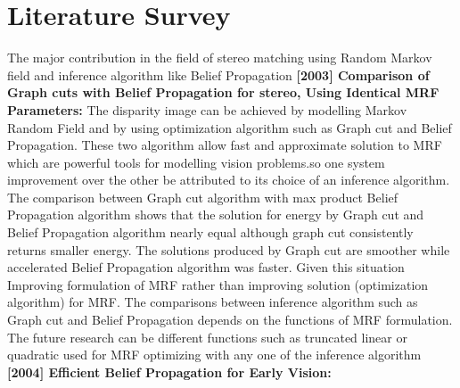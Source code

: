 \chapter{Literature Survey}
%
The major contribution in the field of stereo matching using Random Markov field and inference algorithm like Belief Propagation\newline
\textbf{[2003] Comparison of Graph cuts with Belief Propagation for stereo, Using Identical MRF Parameters:}\cite{r1}\newline
The  disparity image can be achieved  by modelling Markov Random Field and by using optimization algorithm such as Graph cut and Belief Propagation. These two algorithm allow fast and approximate solution to MRF which are powerful tools for modelling vision problems.so one system improvement over the other be attributed to its choice of an inference algorithm.\newline
The comparison between Graph cut algorithm with max product Belief Propagation algorithm shows that the solution for energy  by Graph cut and Belief Propagation  algorithm nearly equal although graph cut consistently returns smaller energy. The solutions produced by Graph cut  are smoother while accelerated Belief Propagation algorithm was faster.\newline
Given this situation Improving formulation of MRF rather than improving solution (optimization algorithm) for MRF.
The comparisons between inference algorithm such as Graph cut and Belief Propagation depends on the functions of MRF formulation.\newline
The future research can be different functions such as truncated linear or quadratic  used for MRF optimizing with any one of the inference algorithm\cite{r1}\newline
\textbf{[2004] Efficient Belief Propagation for Early Vision:}\cite{r2}

